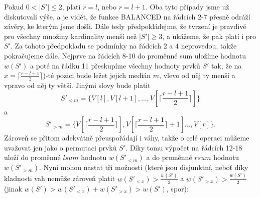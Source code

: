 \documentclass[12pt,a4paper]{article}
\theoremstyle{plain}
\begin{document}
Pokud $0<|S'|\leq 2$, platí $r=l$, nebo $r=l+1$. Oba tyto případy jsme už diskutovali výše, a je vidět, že funkce BALANCED na řádcích 2-7 přesně odráží závěry, ke kterým jsme došli. Dále tedy předpokládejme, že tvrzení je pravdivé pro všechny množiny kardinality menší než $|S'|\geq 3$, a ukážeme, že pak platí i pro $S'$. 
Za tohoto předpokladu se podmínky na řádcích 2 a 4 neprovedou, takže pokračujeme dále. Nejprve na řádcích 8-10 do proměnné sum uložíme hodnotu $w(S')$ a poté na řádku 11 přeskupíme všechny hodnoty prvků $S'$ tak, že na $x=\lceil\frac{r-l+1}{2}\rceil$)-té pozici bude ležet jejich medián $m$, vlevo od něj ty menší a vpravo od něj ty větší. Jinými slovy bude platit $$S'_{<m}=\{V[l],V[l+1],\dots,V[\lceil\frac{r-l+1}{2}\rceil]\}$$ a $$S'_{>m}=\{V[\lceil\frac{r-l+1}{2}\rceil],V[\lceil\frac{r-l+1}{2}\rceil+1]\dots,V[r]\}.$$ Zároveň se přitom adekvátně přeuspořádají i váhy, takže o celé operaci můžeme uvažovat jen jako o permutaci prvků $S'$. Díky tomu výpočet na řádcích 12-18 uloží do proměnné $lsum$ hodnotu $w(S'_{<m})$ a do proměnné $rsum$ hodnotu $w(S'_{>m})$. Nyní mohou nastat tři možnosti (které jsou disjunktní, neboť díky kladnosti vah nemůže zároveň platit $w(S'_{<x})>\frac{w(S')}{2}$ a $w(S'_{>x})>\frac{w(S')}{2}$ (jinak $w(S')>w(S'_{<x})+w(S'_{>x})>w(S')$, spor):
\end{document}
